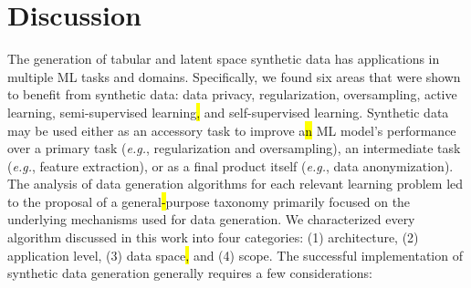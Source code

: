 \section{Discussion}\label{sec:discussion}

The generation of tabular and latent space synthetic data has applications in
multiple ML tasks and domains. Specifically, we found six areas that were
shown to benefit from synthetic data: data privacy, regularization,
oversampling, active learning, semi-supervised learning\hl{,} and self-supervised
learning. Synthetic data may be used either as an accessory task to improve
a\hl{n} ML model's performance over a primary task (\textit{e.g.},
regularization and oversampling), an intermediate task (\textit{e.g.}, feature
extraction), or as a final product itself (\textit{e.g.}, data anonymization).
The analysis of data generation algorithms for each relevant learning problem
led to the proposal of a general\hl{-}purpose taxonomy primarily focused on the
underlying mechanisms used for data generation. We characterized every
algorithm discussed in this work into four categories: (1) architecture, (2)
application level, (3) data space\hl{,} and (4) scope. The successful implementation
of synthetic data generation generally requires a few considerations:

